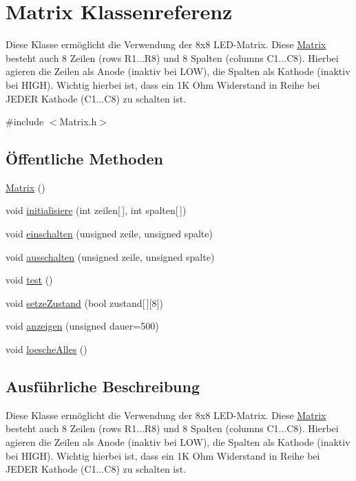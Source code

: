 \hypertarget{classMatrix}{}\section{Matrix Klassenreferenz}
\label{classMatrix}


Diese Klasse ermöglicht die Verwendung der 8x8 L\+E\+D-\/\+Matrix. Diese \hyperlink{classMatrix}{Matrix} besteht auch 8 Zeilen (rows R1...R8) und 8 Spalten (columns C1...C8). Hierbei agieren die Zeilen als Anode (inaktiv bei L\+OW), die Spalten als Kathode (inaktiv bei H\+I\+GH). Wichtig hierbei ist, dass ein 1K Ohm Widerstand in Reihe bei J\+E\+D\+ER Kathode (C1...C8) zu schalten ist.  




{\ttfamily \#include $<$Matrix.\+h$>$}

\subsection*{Öffentliche Methoden}
\begin{DoxyCompactItemize}
\item 
\hyperlink{classMatrix_a2dba13c45127354c9f75ef576f49269b}{Matrix} ()
\item 
void \hyperlink{classMatrix_ab0eb0c710ec849cf46ac44dbc80a60a0}{initialisiere} (int zeilen\mbox{[}$\,$\mbox{]}, int spalten\mbox{[}$\,$\mbox{]})
\item 
void \hyperlink{classMatrix_abea6c950e05056f76264b3ee4c6c0474}{einschalten} (unsigned zeile, unsigned spalte)
\item 
void \hyperlink{classMatrix_a83a04c1348df17c2710baae633975a3f}{ausschalten} (unsigned zeile, unsigned spalte)
\item 
void \hyperlink{classMatrix_a607d16d3c8242dcbb5db75b5872e5561}{test} ()
\item 
void \hyperlink{classMatrix_ac4ae600939342ca37a68aaa62bc7a22c}{setze\+Zustand} (bool zustand\mbox{[}$\,$\mbox{]}\mbox{[}8\mbox{]})
\item 
void \hyperlink{classMatrix_a027d9ff5514e47bb49b2df69fb5c8bd9}{anzeigen} (unsigned dauer=500)
\item 
void \hyperlink{classMatrix_adb92ec745c6a8d3e3db45f29b6605b34}{loesche\+Alles} ()
\end{DoxyCompactItemize}


\subsection{Ausführliche Beschreibung}
Diese Klasse ermöglicht die Verwendung der 8x8 L\+E\+D-\/\+Matrix. Diese \hyperlink{classMatrix}{Matrix} besteht auch 8 Zeilen (rows R1...R8) und 8 Spalten (columns C1...C8). Hierbei agieren die Zeilen als Anode (inaktiv bei L\+OW), die Spalten als Kathode (inaktiv bei H\+I\+GH). Wichtig hierbei ist, dass ein 1K Ohm Widerstand in Reihe bei J\+E\+D\+ER Kathode (C1...C8) zu schalten ist. 

